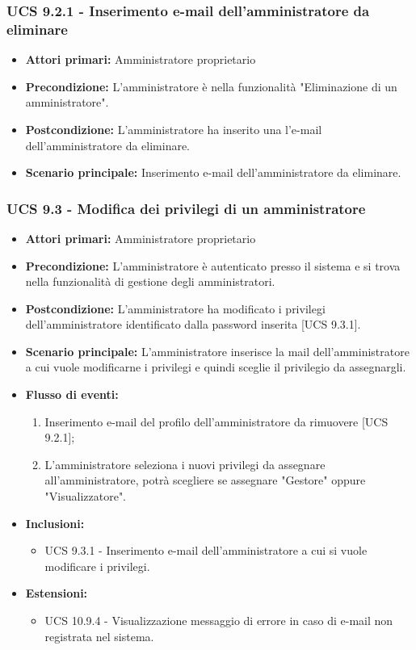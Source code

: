 \subsubsection{UCS 9.2.1 - Inserimento e-mail dell'amministratore da eliminare}%
\begin{itemize}
\item \textbf{Attori primari:} Amministratore proprietario
\item \textbf{Precondizione:} L'amministratore è nella funzionalità "Eliminazione di un amministratore".
\item \textbf{Postcondizione:} L'amministratore ha inserito una l'e-mail dell'amministratore da eliminare.
\item \textbf{Scenario principale:} Inserimento e-mail dell'amministratore da eliminare.
\end{itemize}

\subsubsection{UCS 9.3 - Modifica dei privilegi di un amministratore}%
\begin{itemize}
\item \textbf{Attori primari:} Amministratore proprietario
\item \textbf{Precondizione:} L'amministratore è autenticato presso il sistema e si trova nella funzionalità di gestione degli amministratori.
\item \textbf{Postcondizione:} L'amministratore ha modificato i privilegi dell'amministratore identificato dalla password inserita [UCS 9.3.1].
\item \textbf{Scenario principale:} L'amministratore inserisce la mail dell'amministratore a cui vuole modificarne i privilegi e quindi sceglie il privilegio da assegnargli.
\item \textbf{Flusso di eventi:} %
  \begin{enumerate}
        \item Inserimento e-mail del profilo dell'amministratore da rimuovere [UCS 9.2.1];
        \item L'amministratore seleziona i nuovi privilegi da assegnare all'amministratore, potrà scegliere se assegnare "Gestore" oppure "Visualizzatore".
    \end{enumerate}
\item \textbf{Inclusioni:}
\begin{itemize}
    \item UCS 9.3.1 - Inserimento e-mail dell'amministratore a cui si vuole modificare i privilegi.
\end{itemize}
\item \textbf{Estensioni:}
	\begin{itemize}
		\item UCS 10.9.4 - Visualizzazione messaggio di errore in caso di e-mail non registrata nel sistema.
	\end{itemize}
\end{itemize}

